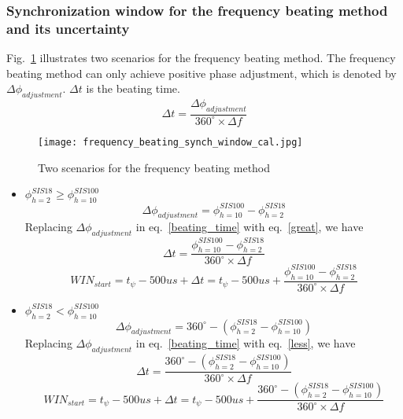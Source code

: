 \subsubsection{ Synchronization window for the frequency beating method and its uncertainty}
Fig.~\ref{frequency_beating} illustrates two scenarios for the frequency beating method. The frequency beating method can only achieve positive phase adjustment, which is denoted by $\Delta \phi_{adjustment}$. $\Delta  t$ is the beating time.
\begin{equation}
	 \Delta t = \frac {\Delta \phi_{adjustment}}{{360^\circ} \times {\Delta f}} \label {beating_time}
   \end{equation}
\begin{figure}[!htb]
   \centering   
   \texttt{[image: frequency\_beating\_synch\_window\_cal.jpg]}
   \caption{Two scenarios for the frequency beating method}
   \label{frequency_beating}
\end{figure}
\begin{itemize}
    \item  $\phi_{h=2}^{SIS18} \ge \phi_{h=10}^{SIS100}$
	\begin{equation}
	 \Delta \phi_{adjustment} = \phi_{h=10}^{SIS100} - \phi_{h=2}^{SIS18}\label {great}
   \end{equation}
   Replacing $\Delta \phi_{adjustment}$ in eq.~\ref{beating_time} with eq.~\ref{great}, we have
	\begin{equation}
	 \Delta t = \frac {\phi_{h=10}^{SIS100} - \phi_{h=2}^{SIS18}}{{360^\circ} \times {\Delta f}} \label {beating_time}
   \end{equation}
	\begin{equation}
	 WIN_{start} = t_{\psi} - 500us + \Delta t =t_{\psi} - 500us +\frac {\phi_{h=10}^{SIS100} - \phi_{h=2}^{SIS18}}{{360^\circ} \times {\Delta f}} \label {beating_win_1}
   \end{equation}
 
    \item $\phi_{h=2}^{SIS18} < \phi_{h=10}^{SIS100}$
	\begin{equation}
	 \Delta \phi_{adjustment} = 360^\circ - (\phi_{h=2}^{SIS18}-\phi_{h=10}^{SIS100}) \label {less}
   \end{equation}
  Replacing $\Delta \phi_{adjustment}$ in eq.~\ref{beating_time} with eq.~\ref{less}, we have
	\begin{equation}
	 \Delta t = \frac {360^\circ - (\phi_{h=2}^{SIS18}-\phi_{h=10}^{SIS100})}{{360^\circ} \times {\Delta f}} \label {beating_time}
   \end{equation}
	\begin{equation}
	 WIN_{start} = t_{\psi} - 500us + \Delta t =t_{\psi} - 500us +\frac {360^\circ - (\phi_{h=2}^{SIS18}-\phi_{h=10}^{SIS100})}{{360^\circ} \times {\Delta f}} \label {beating_win_2}
   \end{equation}
\end{itemize}

